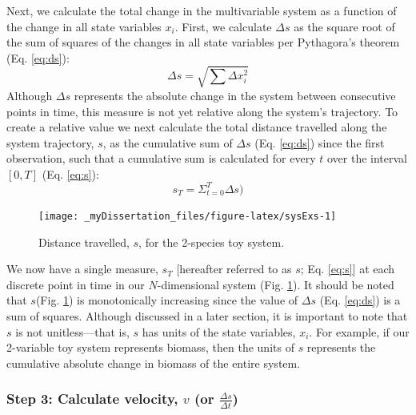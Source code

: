 \documentclass[12pt,twoside,openany]{reedthesis}
\begin{document}
Next, we calculate the total change in the multivariable system as a function of the change in all state variables \(x_i\). First, we calculate \(\Delta s\) as the square root of the sum of squares of the changes in all state variables per Pythagora's theorem (Eq. \eqref{eq:ds}):
\begin{equation}
\Delta s = \sqrt{\sum{\Delta x_i^2}}
\label{eq:ds}
\end{equation}
Although \(\Delta s\) represents the absolute change in the system between consecutive points in time, this measure is not yet relative along the system's trajectory. To create a relative value we next calculate the total distance travelled along the system trajectory, \(s\), as the cumulative sum of \(\Delta s\) (Eq. \eqref{eq:ds}) since the first observation, such that a cumulative sum is calculated for every \(t\) over the interval \([0,T]\) (Eq. \eqref{eq:s}):
\begin{equation}
s_T = \Sigma_{t=0}^{T}{\Delta s}) 
  \label{eq:s}
\end{equation}
\begin{figure}
\texttt{[image: \_myDissertation\_files/figure-latex/sysExs-1]} \caption{Distance travelled, $s$, for the 2-species toy system.}\label{fig:sysExs}
\end{figure}
We now have a single measure, \(s_T\) {[}hereafter referred to as \(s\); Eq. \eqref{eq:s}{]} at each discrete point in time in our \(N\)-dimensional system (Fig. \ref{fig:sysExs}). It should be noted that \(s\)(Fig. \ref{fig:sysExs}) is monotonically increasing since the value of \(\Delta s\) (Eq. \eqref{eq:ds}) is a sum of squares. Although discussed in a later section, it is important to note that \(s\) is not unitless---that is, \(s\) has units of the state variables, \(x_i\). For example, if our 2-variable toy system represents biomass, then the units of \(s\) represents the cumulative absolute change in biomass of the entire system.

\hypertarget{step-3-calculate-velocity-v-or-fracdelta-sdelta-t}{%
\subsubsection{\texorpdfstring{Step 3: Calculate velocity, \(v\) (or \(\frac{\Delta s}{\Delta t}\))}{Step 3: Calculate velocity, v (or \textbackslash frac\{\textbackslash Delta s\}\{\textbackslash Delta t\})}}\label{step-3-calculate-velocity-v-or-fracdelta-sdelta-t}}
\end{document}
